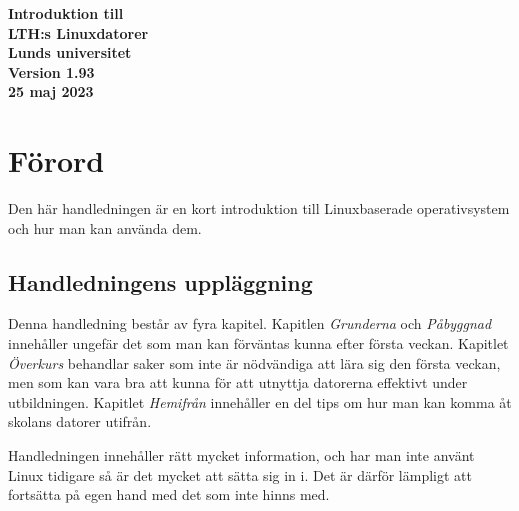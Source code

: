 \documentclass[a4paper,twocolumn]{book}
\begin{document}
\frontmatter

\begin{titlepage}
  \vspace*{30mm}
  \begin{center}
    \sffamily
    \renewcommand{\baselinestretch}{1.1}
    \Huge\bfseries Introduktion till \\[2mm]
    LTH:s Linuxdatorer \\[7mm]
    \large Lunds universitet \\[5mm]
    Version 1.93 \\
    25 maj 2023
  \end{center}
\end{titlepage}

\onecolumn
\thispagestyle{empty}
\hbox{}\vfill\noindent
\twocolumn

{\parskip 0pt%
  \tableofcontents}             %

\chapter{Förord}
\label{cha:forord}

Den här handledningen är en kort introduktion till Linuxbaserade operativsystem och
hur man kan använda dem.

\section*{Handledningens uppläggning}

Denna handledning består av fyra kapitel. Kapitlen \emph{Grunderna} och \emph{Påbyggnad}
innehåller ungefär det som man kan förväntas kunna efter första veckan.
Kapitlet \emph{Överkurs}
behandlar saker som inte är nödvändiga att lära sig den första veckan,
men som kan vara bra att kunna för att utnyttja datorerna effektivt under
utbildningen. Kapitlet \emph{Hemifrån} innehåller en del tips om hur man kan
komma åt skolans datorer utifrån.

Handledningen innehåller rätt mycket information, och har man inte använt Linux
tidigare så är det mycket att sätta sig in i.
Det är därför lämpligt att fortsätta på egen hand med det som
inte hinns med.
\end{document}
